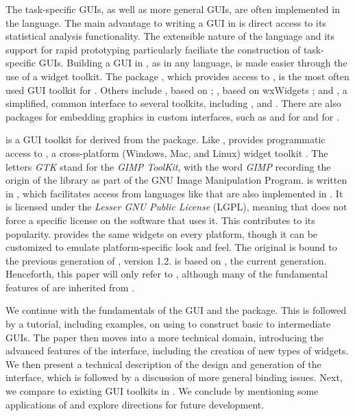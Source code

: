 \documentclass[article]{jss}
\begin{document}
The task-specific GUIs, as well as more general  GUIs,
are often implemented in the  language. The main advantage to 
writing a GUI in  is direct access to its statistical analysis
functionality. The extensible nature of the  language and its support 
for rapid prototyping particularly faciliate the construction of task-specific GUIs.
Building a GUI in , as in any language, is made easier through the use of a 
widget toolkit. The  package \citep{Rnews:Dalgaard:2001a, Rnews:Dalgaard:2002},
which provides access to  \citep{ousterhout,welch}, is the most often 
used GUI toolkit for . Others include  \citep{RGtk}, based
on  \citep{GTK};  \citep{RwxWidgets}, based on
wxWidgets \citep{wxwidgets}; and  \citep{gWidgets}, a
simplified, common interface to several toolkits, including , 
and  . There are also packages for embedding 
graphics in custom interfaces, such as  \citep{gtkDevice} 
and  \citep{cairoDevice} for  and  
\citep{tkrplot} for .

 is a GUI toolkit for  derived from the  package.
Like ,  provides programmatic access to , 
a cross-platform (Windows, Mac, and Linux) widget toolkit \citep{GTK}.
The letters \emph{GTK} stand for the \emph{GIMP ToolKit}, with the
word \emph{GIMP} recording the origin of the library as part of the
GNU Image Manipulation Program.  is written in , which
facilitates access from languages like  that are also implemented 
in . It is licensed under the \emph{Lesser GNU Public License} (LGPL),
meaning that  does not force a specific license on the software that uses it.
This contributes to its popularity.  provides the same widgets 
on every platform, though it can be customized to emulate 
platform-specific look and feel. The original  is bound to the previous
generation of , version 1.2.  is based on ,
the current generation. Henceforth, this paper will only refer to ,
although many of the fundamental features of  are inherited from .

We continue with the fundamentals of the  GUI and the  
package. This is followed by a tutorial, including examples, on using 
 to construct basic to intermediate GUIs. The paper then moves into 
a more technical domain, introducing the advanced features of the interface, 
including the creation of new types of widgets. We then present a technical 
description of the design and generation of
the interface, which is followed by a discussion of more general binding issues.
Next, we compare  to existing GUI toolkits in . We conclude
by mentioning some applications of  and explore directions for future development.
\end{document}
